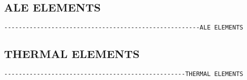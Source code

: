 
\subsection{ALE ELEMENTS}
\begin{verbatim}
------------------------------------------------------ALE ELEMENTS
\end{verbatim}






\subsection{THERMAL ELEMENTS}
\begin{verbatim}
--------------------------------------------------THERMAL ELEMENTS
\end{verbatim}



